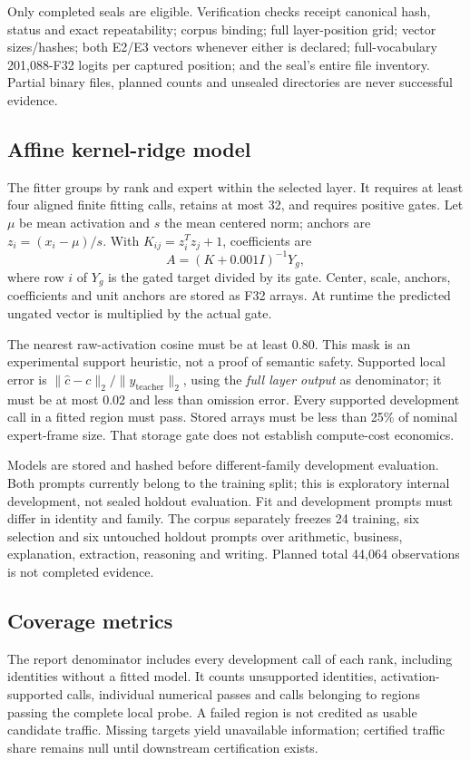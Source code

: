 \documentclass[11pt,a4paper]{article}
\begin{document}
Only completed seals are eligible. Verification checks receipt canonical
hash, status and exact repeatability; corpus binding; full layer-position
grid; vector sizes/hashes; both E2/E3 vectors whenever either is declared;
full-vocabulary 201,088-F32 logits per captured position; and the seal's entire
file inventory. Partial binary files, planned counts and unsealed directories
are never successful evidence.

\subsection{Affine kernel-ridge model}
The fitter groups by rank and expert within the selected layer. It requires
at least four aligned finite fitting calls, retains at most 32, and requires
positive gates. Let $\mu$ be mean activation and $s$ the mean centered norm;
anchors are $z_i=(x_i-\mu)/s$. With $K_{ij}=z_i^Tz_j+1$, coefficients are
\[
 A=(K+0.001I)^{-1}Y_g,
\]
where row $i$ of $Y_g$ is the gated target divided by its gate. Center, scale,
anchors, coefficients and unit anchors are stored as F32 arrays. At runtime
the predicted ungated vector is multiplied by the actual gate.

The nearest raw-activation cosine must be at least 0.80. This mask is an
experimental support heuristic, not a proof of semantic safety. Supported
local error is $\|\widehat c-c\|_2/\|y_{\mathrm{teacher}}\|_2$, using the
\emph{full layer output} as denominator; it must be at most 0.02 and less
than omission error. Every supported development call in a fitted region
must pass. Stored arrays must be less than 25\% of nominal expert-frame size.
That storage gate does not establish compute-cost economics.

Models are stored and hashed before different-family development evaluation.
Both prompts currently belong to the training split; this is exploratory
internal development, not sealed holdout evaluation. Fit and development
prompts must differ in identity and family. The corpus separately freezes
24 training, six selection and six untouched holdout prompts over arithmetic,
business, explanation, extraction, reasoning and writing. Planned total
44,064 observations is not completed evidence.

\subsection{Coverage metrics}
The report denominator includes every development call of each rank,
including identities without a fitted model. It counts unsupported identities,
activation-supported calls, individual numerical passes and calls belonging
to regions passing the complete local probe. A failed region is not credited
as usable candidate traffic. Missing targets yield unavailable information;
certified traffic share remains null until downstream certification exists.
\end{document}
